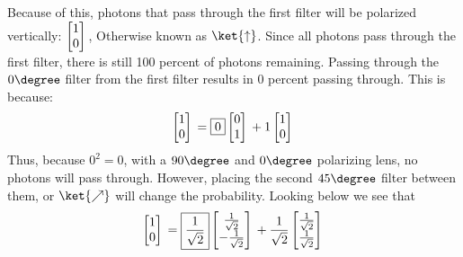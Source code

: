 \documentclass{article}
\begin{document}
    Because of this, photons that pass through the first filter will be polarized vertically:  $\begin{bmatrix}
        1\\
        0
    \end{bmatrix}\\$, Otherwise known as $\ket{\uparrow}$. Since all photons pass through the first filter, there is still 100 percent of photons remaining. Passing through the $0\degree$ filter from the first filter results in 0 percent passing through. This is because: $$\begin{bmatrix}
        1\\
        0
    \end{bmatrix}\\ = \boxed{0}\begin{bmatrix}
        0\\
        1
    \end{bmatrix}\\ + 1\begin{bmatrix}
        1\\
        0
    \end{bmatrix}\\$$   Thus, because $0^{2}=0$, with a $90\degree$ and $0\degree$ polarizing lens, no photons will pass through. However, placing the second $45\degree$ filter between them, or $\ket{\nearrow}$ will change the probability. Looking below we see that $$\begin{bmatrix}
        1\\
        0
    \end{bmatrix}\\ = \boxed{\frac{1}{\sqrt{2}}}\begin{bmatrix}
        \frac{1}{\sqrt{2}}\\
        -\frac{1}{\sqrt{2}}
    \end{bmatrix}\\ + \frac{1}{\sqrt{2}}\begin{bmatrix}
        \frac{1}{\sqrt{2}}\\
        \frac{1}{\sqrt{2}}
    \end{bmatrix}\\$$
\end{document}
